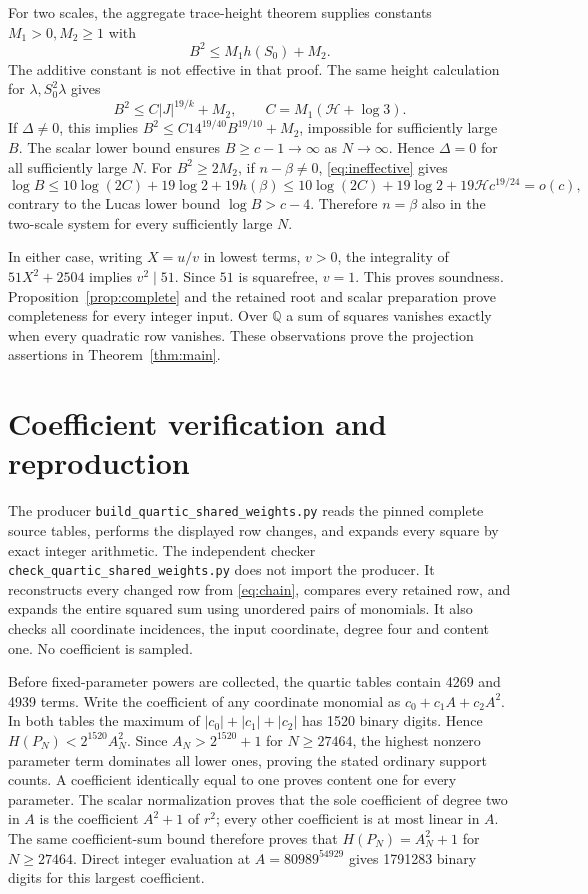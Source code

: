 \documentclass[11pt,a4paper]{article}
\theoremstyle{remark}\newtheorem{remark}[theorem]{Remark}
\newcommand{\Q}{\mathbb Q}\newcommand{\Z}{\mathbb Z}\newcommand{\HH}{\mathcal H}
\begin{document}
For two scales, the aggregate trace-height theorem supplies constants
$M_1>0,M_2\ge1$ with
\[
 B^2\le M_1h(S_0)+M_2.
\]
The additive constant is not effective in that proof. The same
height calculation for $\lambda,S_0^2\lambda$ gives
\begin{equation}\label{eq:ineffective}
 B^2\le C|J|^{19/k}+M_2,\qquad C=M_1(\HH+\log3).
\end{equation}
If $\Delta\ne0$, this implies
$B^2\le C14^{19/40}B^{19/10}+M_2$, impossible for sufficiently large $B$.
The scalar lower bound ensures $B\ge c-1\to\infty$ as $N\to\infty$.
Hence $\Delta=0$ for all sufficiently large $N$. For $B^2\ge2M_2$,
if $n-\beta\ne0$, \eqref{eq:ineffective} gives
\[
 \log B\le10\log(2C)+19\log2+19h(\beta)
 \le10\log(2C)+19\log2+19\HH c^{19/24}=o(c),
\]
contrary to the Lucas lower bound $\log B>c-4$. Therefore $n=\beta$
also in the two-scale system for every sufficiently large $N$.

In either case, writing $X=u/v$ in lowest terms, $v>0$, the integrality
of $51X^2+2504$ implies $v^2\mid51$. Since $51$ is squarefree, $v=1$.
This proves soundness. Proposition~\ref{prop:complete} and the retained
root and scalar preparation prove completeness for every integer input.
Over $\Q$ a sum of squares vanishes exactly when every quadratic row
vanishes. These observations prove the projection assertions in
Theorem~\ref{thm:main}.

\section{Coefficient verification and reproduction}
The producer \nolinkurl{build_quartic_shared_weights.py} reads the
pinned complete source tables, performs the displayed row changes, and
expands every square by exact integer arithmetic. The independent checker
\nolinkurl{check_quartic_shared_weights.py} does not import the producer.
It reconstructs every changed row from \eqref{eq:chain}, compares every
retained row, and expands the entire squared sum using unordered pairs
of monomials. It also checks all coordinate incidences, the input
coordinate, degree four and content one. No coefficient is sampled.

Before fixed-parameter powers are collected, the quartic tables contain
4269 and 4939 terms. Write the coefficient of any coordinate monomial as
$c_0+c_1A+c_2A^2$. In both tables the maximum of
$|c_0|+|c_1|+|c_2|$ has 1520 binary digits. Hence
$H(P_N)<2^{1520}A_N^2$. Since $A_N>2^{1520}+1$ for $N\ge27464$, the
highest nonzero parameter term dominates all lower ones, proving the
stated ordinary support counts. A coefficient identically equal to one
proves content one for every parameter. The scalar normalization proves that the sole coefficient of degree
two in $A$ is the coefficient $A^2+1$ of $r^2$; every other coefficient
is at most linear in $A$. The same coefficient-sum bound therefore
proves that $H(P_N)=A_N^2+1$ for $N\ge27464$. Direct integer evaluation
at $A=80989^{54929}$ gives 1791283 binary digits for this largest coefficient.
\end{document}
